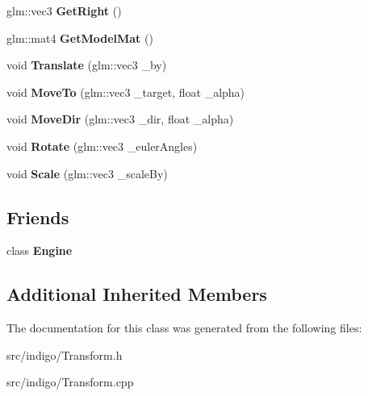 \begin{DoxyCompactItemize}
glm\+::vec3 {\bfseries Get\+Right} ()
\item 
\mbox{\label{class_indigo_1_1_transform_ad4d433d8ecad0eb730be4294c57938db}} 
glm\+::mat4 {\bfseries Get\+Model\+Mat} ()
\item 
\mbox{\label{class_indigo_1_1_transform_a2b3b2d50122bf966469832d5fc361834}} 
void {\bfseries Translate} (glm\+::vec3 \+\_\+by)
\item 
\mbox{\label{class_indigo_1_1_transform_a78633ea6630bd3ce493529ff122354e6}} 
void {\bfseries Move\+To} (glm\+::vec3 \+\_\+target, float \+\_\+alpha)
\item 
\mbox{\label{class_indigo_1_1_transform_a0d837c0a1d80c8e249e854c584b4b728}} 
void {\bfseries Move\+Dir} (glm\+::vec3 \+\_\+dir, float \+\_\+alpha)
\item 
\mbox{\label{class_indigo_1_1_transform_a41b24ff268187636f66dfa65432bda3a}} 
void {\bfseries Rotate} (glm\+::vec3 \+\_\+euler\+Angles)
\item 
\mbox{\label{class_indigo_1_1_transform_abb94f1c5b70ed256da1629130d680dee}} 
void {\bfseries Scale} (glm\+::vec3 \+\_\+scale\+By)
\end{DoxyCompactItemize}
\subsection*{Friends}
\begin{DoxyCompactItemize}
\item 
\mbox{\label{class_indigo_1_1_transform_a3e1914489e4bed4f9f23cdeab34a43dc}} 
class {\bfseries Engine}
\end{DoxyCompactItemize}
\subsection*{Additional Inherited Members}


The documentation for this class was generated from the following files\+:\begin{DoxyCompactItemize}
\item 
src/indigo/Transform.\+h\item 
src/indigo/Transform.\+cpp\end{DoxyCompactItemize}
